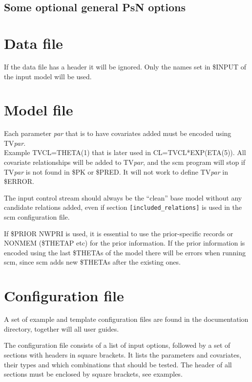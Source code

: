 \subsection{Some optional general PsN options}
\begin{optionlist}
	
\end{optionlist}


\section{Data file}
If the data file has a header it will be ignored. Only the names set in \$INPUT of the input model will be used.

\section{Model file}
Each parameter \emph{par} that is to have covariates added must be encoded using TV\emph{par}.\\
Example TVCL=THETA(1) that is later used in CL=TVCL*EXP(ETA(5)). All covariate relationships will be added to TV\emph{par}, and the scm program will stop if TV\emph{par} is not found in \$PK or \$PRED. It will not work to define TV\emph{par} in \$ERROR.

The input control stream should always be the ``clean'' base model without any candidate relations added, even if section 
\verb|[included_relations]| is used in the scm configuration file. 

If \$PRIOR NWPRI is used, it is essential to use the prior-specific records or NONMEM (\$THETAP etc) for the prior information. If the prior information is encoded using the last \$THETAs of the model there will be errors when running scm, since scm adds new \$THETAs after the existing ones. 

\section{Configuration file}
A set of example and template configuration files are found in the documentation directory, together will all user guides.

The configuration file consists of a list of input options, followed by a set of sections with headers in square brackets. It lists the parameters and covariates, their types and which combinations that should be tested. The header of all sections must be enclosed by square brackets, see examples. 

